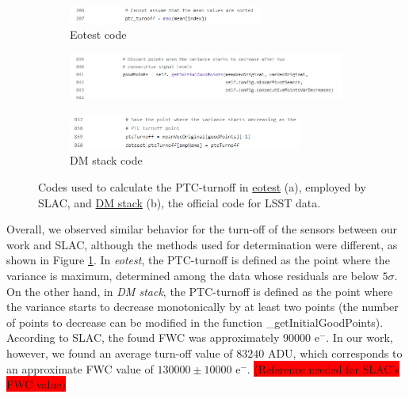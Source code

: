 \begin{figure}[!htb]
     \begin{subfigure}[b]{\textwidth}
         
         \includegraphics[width=0.7\textwidth,left]{Figures/eotest_turnoff.jpg}
         \caption{Eotest code}
     \end{subfigure}
     \vspace{3mm}
     \begin{subfigure}[b]{\textwidth}
         
         \includegraphics[width=\textwidth,left]{Figures/DMstack_turnoff1.jpg}
     \end{subfigure}    
     \vspace{3mm}
     \begin{subfigure}[b]{\textwidth}
         
         \includegraphics[width=0.85\textwidth,left]{Figures/DMstack_turnoff2.jpg}
         \caption{DM stack code}
     \end{subfigure}
        \caption{Codes used to calculate the PTC-turnoff in \href{https://github.com/lsst-camera-dh/eotest/blob/32c17b0a33b9c099651ed581ee90c1b1101012fb/python/lsst/eotest/sensor/ptcTask.py}{eotest} (a), employed by SLAC, and \href{https://github.com/lsst/cp_pipe/blob/6bae47012f2f119b186509ce7efd963b68b61f0d/python/lsst/cp/pipe/ptc/cpSolvePtcTask.py}{DM stack} (b), the official code for LSST data.}
        \label{fig:Turnoff_codes}
\end{figure}
Overall, we observed similar behavior for the turn-off of the sensors between our work and SLAC, although the methods used for determination were different, as shown in Figure \ref{fig:Turnoff_codes}. In \textit{eotest}, the PTC-turnoff is defined as the point where the variance is maximum, determined among the data whose residuals are below $5\sigma$. On the other hand, in \textit{DM stack}, the PTC-turnoff is defined as the point where the variance starts to decrease monotonically by at least two points (the number of points to decrease can be modified in the function \_getInitialGoodPoints). According to SLAC, the found FWC was approximately 90000 e$^-$. In our work, however, we found an average turn-off value of $83240$ ADU, which corresponds to an approximate FWC value of $130000 \pm 10000$ e$^-$. \colorbox{red}{(Reference needed for SLAC's FWC value)}


